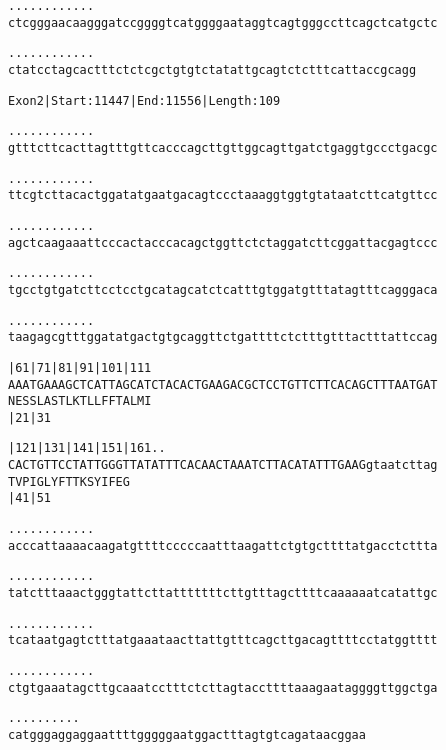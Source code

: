 \documentclass{article}
\begin{document}
\newpage
\begin{alltt}
 .    .    .    .    .    .    .    .    .    .    .    .   
ctcgggaacaagggatccggggtcatggggaataggtcagtgggccttcagctcatgctc

 .    .    .    .    .    .    .    .    .    .    .    .
ctatcctagcactttctctcgctgtgtctatattgcagtctctttcattaccgcagg
\end{alltt}
\newpage
\begin{alltt}
Exon 2 | Start: 11447 | End: 11556 | Length: 109

.    .    .    .    .    .    .    .    .    .    .    .    
gtttcttcacttagtttgttcacccagcttgttggcagttgatctgaggtgccctgacgc

.    .    .    .    .    .    .    .    .    .    .    .    
ttcgtcttacactggatatgaatgacagtccctaaaggtggtgtataatcttcatgttcc

.    .    .    .    .    .    .    .    .    .    .    .    
agctcaagaaattcccactacccacagctggttctctaggatcttcggattacgagtccc

.    .    .    .    .    .    .    .    .    .    .    .    
tgcctgtgatcttcctcctgcatagcatctcatttgtggatgtttatagtttcagggaca

.    .    .    .    .    .    .    .    .    .    .    .    
taagagcgtttggatatgactgtgcaggttctgattttctctttgtttactttattccag

       |61       |71       |81       |91       |101      |111
AAATGAAAGCTCATTAGCATCTACACTGAAGACGCTCCTGTTCTTCACAGCTTTAATGAT
 N  E  S  S  L  A  S  T  L  K  T  L  L  F  F  T  A  L  M  I 
       |21                           |31                    

       |121      |131      |141      |151      |161   .    .
CACTGTTCCTATTGGGTTATATTTCACAACTAAATCTTACATATTTGAAGgtaatcttag
 T  V  P  I  G  L  Y  F  T  T  K  S  Y  I  F  E  G          
       |41                           |51                    

    .    .    .    .    .    .    .    .    .    .    .    .
acccattaaaacaagatgttttcccccaatttaagattctgtgcttttatgacctcttta

    .    .    .    .    .    .    .    .    .    .    .    .
tatctttaaactgggtattcttatttttttcttgtttagcttttcaaaaaatcatattgc

    .    .    .    .    .    .    .    .    .    .    .    .
tcataatgagtctttatgaaataacttattgtttcagcttgacagttttcctatggtttt

    .    .    .    .    .    .    .    .    .    .    .    .
ctgtgaaatagcttgcaaatcctttctcttagtaccttttaaagaataggggttggctga

    .    .    .    .    .    .    .    .    .    .
catgggaggaggaattttgggggaatggactttagtgtcagataacggaa
\end{alltt}
\end{document}

